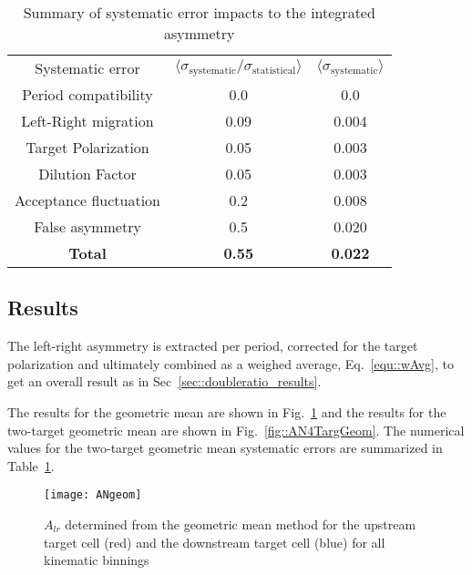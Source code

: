 \begin{table}[h!t]
  \centering
  \begin{tabular}{|c|c|c|}
    \hline
    \multirow{2}{*}{Systematic error}&
    \multirow{2}{*}{
      $\langle \sigma_{\mathrm{systematic}}/\sigma_{\mathrm{statistical}}
      \rangle$} &
    \multirow{2}{*}{$\langle \sigma_{\mathrm{systematic}} \rangle$}\\
    & & \\ \hline \hline

    Period compatibility& 0.0 & 0.0\\ \hline

    Left-Right migration& 0.09 & 0.004\\ \hline

    Target Polarization& 0.05& 0.003\\ \hline

    Dilution Factor& 0.05 & 0.003\\ \hline

    Acceptance fluctuation& 0.2 & 0.008\\ \hline

    False asymmetry& 0.5 & 0.020\\ \hline \hline
    \textbf{Total}& \textbf{0.55} & \textbf{0.022}\\\hline
    
  \end{tabular}
  \caption{Summary of systematic error impacts to the integrated asymmetry}
  \label{tab::sysError}
\end{table}

\subsection{Results} \label{sec::lr_results}
The left-right asymmetry is extracted per period, corrected for the target
polarization and ultimately combined as a weighed average, Eq.~\ref{equ::wAvg},
to get an overall result as in Sec~\ref{sec::doubleratio_results}.

The results for the geometric mean are shown in Fig.~\ref{fig::ANgeom} and the
results for the two-target geometric mean are shown in
Fig.~\ref{fig::AN4TargGeom}.  The numerical values for the two-target geometric
mean systematic errors are summarized in Table~\ref{tab::sysError}.

\begin{figure}[h!t]
  \begin{center}
    \texttt{[image: ANgeom]}
    \caption{$A_{lr}$ determined from the geometric mean method for the upstream
      target cell (red) and the downstream target cell (blue) for all kinematic
      binnings}
    \label{fig::ANgeom}
  \end{center}
\end{figure}

